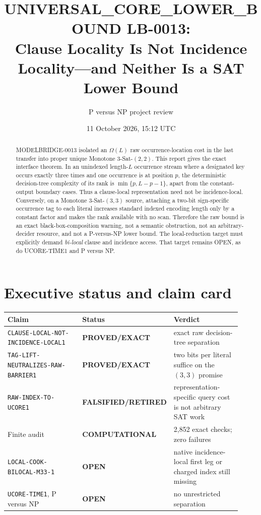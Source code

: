 \documentclass[11pt]{article}
\title{UNIVERSAL\_CORE\_LOWER\_BOUND LB-0013:\\
Clause Locality Is Not Incidence Locality---and Neither Is a SAT Lower Bound}
\author{P versus NP project review}
\date{11 October 2026, 15:12 UTC}
\newcommand{\EXACT}{\textbf{PROVED/EXACT}}
\newcommand{\OPEN}{\textbf{OPEN}}
\newcommand{\RETIRED}{\textbf{FALSIFIED/RETIRED}}
\newcommand{\COMP}{\textbf{COMPUTATIONAL}}
\begin{document}
\maketitle

\begin{abstract}
MODELBRIDGE-0013 isolated an $\Omega(L)$ raw occurrence-location cost in the
last transfer into proper unique Monotone 3-Sat-$(2,2)$.  This report gives
the exact interface theorem.  In an unindexed length-$L$ occurrence stream
where a designated key occurs exactly three times and one occurrence is at
position $p$, the deterministic decision-tree complexity of its rank is
$\min\{p,L-p-1\}$, apart from the constant-output boundary cases.  Thus a
clause-local representation need not be incidence-local.  Conversely, on a
Monotone 3-Sat-$(3,3)$ source, attaching a two-bit sign-specific occurrence
tag to each literal increases standard indexed encoding length only by a
constant factor and makes the rank available with no scan.  Therefore the
raw bound is an exact black-box-composition warning, not a semantic
obstruction, not an arbitrary-decider resource, and not a P-versus-NP lower
bound.  The local-reduction target must explicitly demand \emph{bi-local}
clause and incidence access.  That target remains OPEN, as do UCORE-TIME1
and P versus NP.
\end{abstract}

\section{Executive status and claim card}

\begin{center}\footnotesize
\begin{tabular}{@{}p{0.39\linewidth}p{0.20\linewidth}p{0.33\linewidth}@{}}
\toprule Claim & Status & Verdict\\ \midrule
\texttt{CLAUSE-LOCAL-NOT-INCIDENCE-LOCAL1} & \EXACT & exact raw
decision-tree separation\\
\texttt{TAG-LIFT-NEUTRALIZES-RAW-BARRIER1} & \EXACT & two bits per
literal suffice on the $(3,3)$ promise\\
\texttt{RAW-INDEX-TO-UCORE1} & \RETIRED & representation-specific query
cost is not arbitrary SAT work\\
Finite audit & \COMP & 2,852 exact checks; zero failures\\
\texttt{LOCAL-COOK-BILOCAL-M33-1} & \OPEN & native incidence-local first
leg or charged index still missing\\
\texttt{UCORE-TIME1}, P versus NP & \OPEN & no unrestricted separation\\
\bottomrule
\end{tabular}
\end{center}
\end{document}
